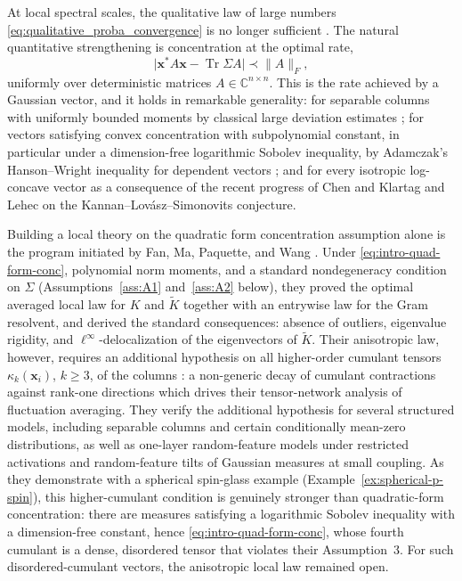 \documentclass[11pt,reqno]{amsart}
\def\x{\mathbf{x}}
\def\C{\mathbb{C}}
\def\Tr{\operatorname{Tr}}
\theoremstyle{definition}
\numberwithin{equation}{section}
\numberwithin{figure}{section}
\begin{document}
At local spectral scales, the qualitative law of large numbers \eqref{eq:qualitative_proba_convergence} is no longer sufficient \cite[Section~2.6]{fan2026anisotropic}. The natural quantitative strengthening is concentration at the optimal rate,
\begin{equation}\label{eq:intro-quad-form-conc}
 \big|\x^*A\x-\Tr\Sigma A\big|\prec\|A\|_F,
\end{equation}
uniformly over deterministic matrices $A\in\C^{n\times n}$. This is the rate achieved by a Gaussian vector, and it holds in remarkable generality: for separable columns with uniformly bounded moments by classical large deviation estimates \cite{rudelson2013hanson,erdHos2017dynamical}; for vectors satisfying convex concentration with subpolynomial constant, in particular under a dimension-free logarithmic Sobolev inequality, by Adamczak's Hanson--Wright inequality for dependent vectors \cite{adamczak2015note}; and for every isotropic log-concave vector \cite{bao2025extreme} as a consequence of the recent progress of Chen \cite{chen2021almost} and Klartag and Lehec \cite{klartag2022bourgain} on the Kannan--Lov\'asz--Simonovits conjecture.

Building a local theory on the quadratic form concentration assumption alone is the program initiated by Fan, Ma, Paquette, and Wang \cite{fan2026anisotropic}. Under \eqref{eq:intro-quad-form-conc}, polynomial norm moments, and a standard nondegeneracy condition on $\Sigma$ (Assumptions~\ref{ass:A1} and~\ref{ass:A2} below), they proved the optimal averaged local law for $K$ and $\widetilde K$ together with an entrywise law for the Gram resolvent, and derived the standard consequences: absence of outliers, eigenvalue rigidity, and $\ell^\infty$-delocalization of the eigenvectors of $\widetilde K$. Their anisotropic law, however, requires an additional hypothesis on all higher-order cumulant tensors $\kappa_k(\x_i)$, $k\ge3$, of the columns \cite[Assumption~3]{fan2026anisotropic}: a non-generic decay of cumulant contractions against rank-one directions which drives their tensor-network analysis of fluctuation averaging. They verify the additional hypothesis for several structured models, including separable columns and certain conditionally mean-zero distributions, as well as one-layer random-feature models under restricted activations and random-feature tilts of Gaussian measures at small coupling.  As they demonstrate with a spherical spin-glass example (Example~\ref{ex:spherical-p-spin}), this higher-cumulant condition is genuinely stronger than quadratic-form concentration: there are measures satisfying a logarithmic Sobolev inequality with a dimension-free constant, hence \eqref{eq:intro-quad-form-conc}, whose fourth cumulant is a dense, disordered tensor that violates their Assumption~3. For such disordered-cumulant vectors, the anisotropic local law remained open.
\end{document}

